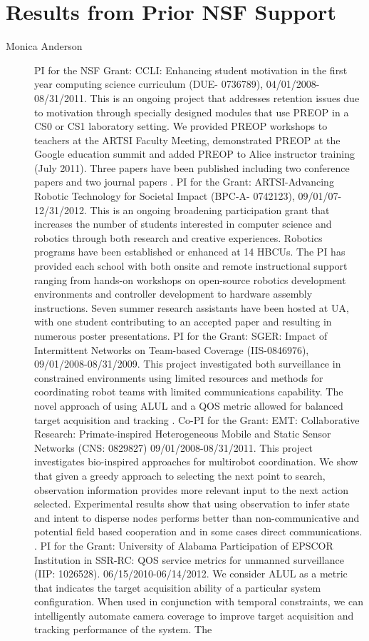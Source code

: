 
\section{Results from Prior NSF Support}\label{sec:prior-nsf}
\begin{description}
\item [Monica Anderson] PI for the NSF Grant: CCLI: Enhancing student motivation in the first year computing science curriculum (DUE- 0736789), 04/01/2008-08/31/2011.  This is an ongoing project that addresses retention issues due to motivation through specially designed modules that use PREOP in a CS0 or CS1 laboratory setting.  We provided PREOP workshops to teachers at the ARTSI Faculty Meeting, demonstrated PREOP at the Google education summit and added PREOP to Alice instructor training (July 2011). Three papers have been published including two conference papers and two journal papers \cite{Davis2009,wellman2009alice,Wellman2009b,Anderson}.  PI for the Grant: ARTSI-Advancing Robotic Technology for Societal Impact (BPC-A- 0742123), 09/01/07-12/31/2012. This is an ongoing broadening participation grant that increases the number of students interested in computer science and robotics through both research and creative experiences. Robotics programs have been established or enhanced at 14 HBCUs. The PI has provided each school with both onsite and remote instructional support ranging from hands-on workshops on open-source robotics development environments and controller development to hardware assembly instructions. Seven summer research assistants have been hosted at UA, with one student contributing to an accepted paper \cite{Wellman2009} and resulting in numerous poster presentations.  PI for the Grant: SGER: Impact of Intermittent Networks on Team-based Coverage (IIS-0846976), 09/01/2008-08/31/2009. This project investigated both surveillance in constrained environments using limited resources and methods for coordinating robot teams with limited communications capability. The novel approach of using ALUL and a QOS metric allowed for balanced target acquisition and tracking \cite{Veluchamy2010,Alexander2009,Mckenzie2010,McKenzie2009}.  Co-PI for the Grant: EMT: Collaborative Research: Primate-inspired Heterogeneous Mobile and Static Sensor Networks (CNS: 0829827) 09/01/2008-08/31/2011. This project investigates bio-inspired approaches for multirobot coordination. We show that given a greedy approach to selecting the next point to search, observation information provides more relevant input to the next action selected. Experimental results show that using observation to infer state and intent to disperse nodes performs better than non-communicative and potential field based cooperation and in some cases direct communications. \cite{Wellman2009d,Dawson2011,Dawson2010,Dawson2011b,Wellman2009c}.  PI for the Grant: University of Alabama Participation of EPSCOR Institution in SSR-RC: QOS service metrics for unmanned surveillance (IIP: 1026528).  06/15/2010-06/14/2012. We consider ALUL as a metric that indicates the target acquisition ability of a particular system configuration. When used in conjunction with temporal constraints, we can intelligently automate camera coverage to improve target acquisition and tracking performance of the system. The 
\end{description}
